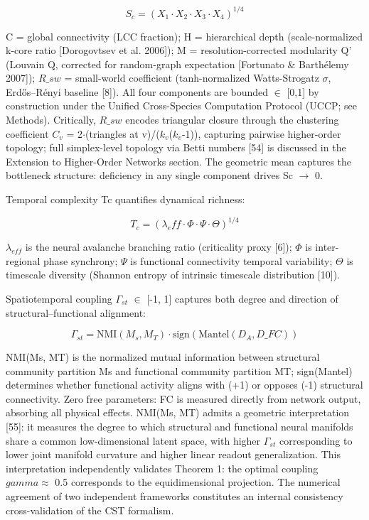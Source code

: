\documentclass[a4paper,12pt]{article}
\begin{document}
\begin{equation}
S_c = (X_1 \cdot X_2 \cdot X_3 \cdot X_4)^{1/4} \tag{2}
\end{equation}


C = global connectivity (LCC fraction); H = hierarchical depth (scale-normalized k-core ratio [Dorogovtsev et al. 2006]); M = resolution-corrected modularity Q' (Louvain Q, corrected for random-graph expectation [Fortunato \& Barth\'elemy 2007]); $R\_{sw}$ = small-world coefficient (tanh-normalized Watts-Strogatz $\sigma$, Erd\H{o}s--R\'enyi baseline [8]).
All four components are bounded $\in$ [0,1] by construction under the Unified Cross-Species Computation Protocol (UCCP; see Methods).
Critically, $R\_{sw}$ encodes triangular closure through the clustering coefficient $C_{v}$ = 2$\cdot$(triangles at v)/($k_{v}$($k_{v}$-1)), capturing pairwise higher-order topology; full simplex-level topology via Betti numbers [54] is discussed in the Extension to Higher-Order Networks section.
The geometric mean captures the bottleneck structure: deficiency in any single component drives Sc $\rightarrow$ 0.


Temporal complexity Tc quantifies dynamical richness:


\begin{equation}
T_c = (\lambda_eff \cdot \Phi \cdot \Psi \cdot \Theta)^{1/4} \tag{3}
\end{equation}


$\lambda_{eff}$ is the neural avalanche branching ratio (criticality proxy [6]); $\Phi$ is inter-regional phase synchrony; $\Psi$ is functional connectivity temporal variability; $\Theta$ is timescale diversity (Shannon entropy of intrinsic timescale distribution [10]).


Spatiotemporal coupling $\Gamma_{st}$ $\in$ [-1, 1] captures both degree and direction of structural--functional alignment:


\begin{equation}
\Gamma_{st} = \text{NMI}(M_s, M_T) \cdot \text{sign}(\text{Mantel}(D_A, D\_{FC})) \tag{4}
\end{equation}


NMI(Ms, MT) is the normalized mutual information between structural community partition Ms and functional community partition MT; sign(Mantel) determines whether functional activity aligns with (+1) or opposes (-1) structural connectivity.
Zero free parameters: FC is measured directly from network output, absorbing all physical effects.
NMI(Ms, MT) admits a geometric interpretation [55]: it measures the degree to which structural and functional neural manifolds share a common low-dimensional latent space, with higher $\Gamma_{st}$ corresponding to lower joint manifold curvature and higher linear readout generalization.
This interpretation independently validates Theorem 1: the optimal coupling $gamma \approx$ 0.5 corresponds to the equidimensional projection.
The numerical agreement of two independent frameworks constitutes an internal consistency cross-validation of the CST formalism.
\end{document}
